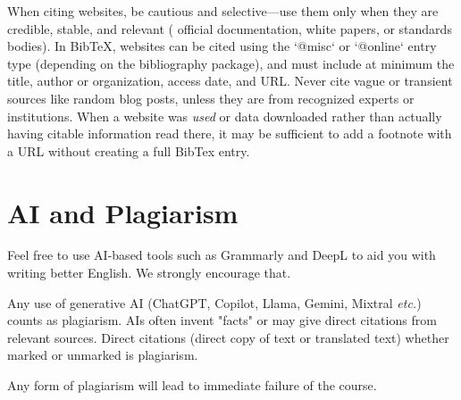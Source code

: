 \documentclass[sigconf,nonacm,screen]{acmart}
\begin{document}
When citing websites, be cautious and selective—use them only when they are credible, stable, and relevant (\eg{} official documentation, white papers, or standards bodies). In BibTeX, websites can be cited using the `@misc` or `@online` entry type (depending on the bibliography package), and must include at minimum the title, author or organization, access date, and URL. Never cite vague or transient sources like random blog posts, unless they are from recognized experts or institutions. When a website was \textit{used} or data downloaded rather than actually having citable information read there, it may be sufficient to add a footnote with a URL without creating a full BibTex entry. \cite{Nobody06}

\section{AI and Plagiarism}
Feel free to use AI-based tools such as Grammarly and DeepL to aid you with writing better English. We strongly encourage that.

Any use of generative AI (ChatGPT, Copilot, Llama, Gemini, Mixtral \textit{etc.}) counts as plagiarism. AIs often invent "facts" or may give direct citations from relevant sources. Direct citations (direct copy of text or translated text) whether marked or unmarked is plagiarism.

Any form of plagiarism will lead to immediate failure of the course.



\end{document}
